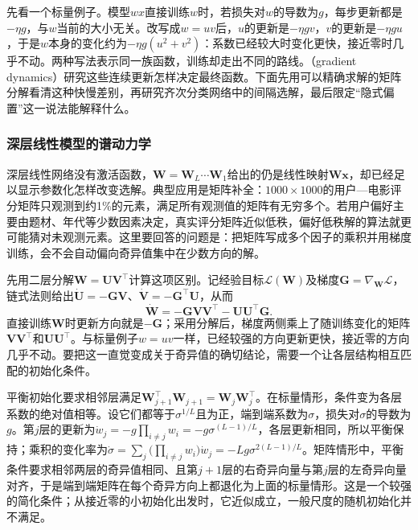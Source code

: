 先看一个标量例子。模型$wx$直接训练$w$时，若损失对$w$的导数为$g$，每步更新都是$-\eta g$，与$w$当前的大小无关。改写成$w=uv$后，$u$的更新是$-\eta gv$，$v$的更新是$-\eta gu$，于是$w$本身的变化约为$-\eta g(u^2+v^2)$：系数已经较大时变化更快，接近零时几乎不动。两种写法表示同一族函数，训练却走出不同的路线。（gradient dynamics）研究这些连续更新怎样决定最终函数。下面先用可以精确求解的矩阵分解看清这种快慢差别，再研究齐次分类网络中的间隔选解，最后限定“隐式偏置”这一说法能解释什么。

\subsubsection{深层线性模型的谱动力学}

深层线性网络没有激活函数，$\bm W=\bm W_L\cdots\bm W_1$给出的仍是线性映射$\bm W\bm x$，却已经足以显示参数化怎样改变选解。典型应用是矩阵补全：$1000\times1000$的用户—电影评分矩阵只观测到约1\%的元素，满足所有观测值的矩阵有无穷多个。若用户偏好主要由题材、年代等少数因素决定，真实评分矩阵近似低秩，偏好低秩解的算法就更可能猜对未观测元素。这里要回答的问题是：把矩阵写成多个因子的乘积并用梯度训练，会不会自动偏向奇异值集中在少数方向的解。

先用二层分解$\bm W=\bm U\bm V^\top$计算这项区别。记经验目标$\mathcal L(\bm W)$及梯度$\bm G=\nabla_{\bm W}\mathcal L$，链式法则给出$\dot{\bm U}=-\bm G\bm V$、$\dot{\bm V}=-\bm G^\top\bm U$，从而
\begin{equation}
 \dot{\bm W}=-\bm G\bm V\bm V^\top-\bm U\bm U^\top\bm G.
 \label{eq:factorized-gradient-flow}
\end{equation}
直接训练$\bm W$时更新方向就是$-\bm G$；采用分解后，梯度两侧乘上了随训练变化的矩阵$\bm V\bm V^\top$和$\bm U\bm U^\top$。与标量例子$w=uv$一样，已经较强的方向更新更快，接近零的方向几乎不动。要把这一直觉变成关于奇异值的确切结论，需要一个让各层结构相互匹配的初始化条件。

平衡初始化要求相邻层满足$\bm W_{j+1}^\top\bm W_{j+1}=\bm W_j\bm W_j^\top$。在标量情形，条件变为各层系数的绝对值相等。设它们都等于$\sigma^{1/L}$且为正，端到端系数为$\sigma$，损失对$\sigma$的导数为$g$。第$j$层的更新为$\dot w_j=-g\prod_{i\neq j}w_i=-g\sigma^{(L-1)/L}$，各层更新相同，所以平衡保持；乘积的变化率为$\dot\sigma=\sum_j\bigl(\prod_{i\neq j}w_i\bigr)\dot w_j=-Lg\sigma^{2(L-1)/L}$。矩阵情形中，平衡条件要求相邻两层的奇异值相同、且第$j+1$层的右奇异向量与第$j$层的左奇异向量对齐，于是端到端矩阵在每个奇异方向上都退化为上面的标量情形。这是一个较强的简化条件；从接近零的小初始化出发时，它近似成立，一般尺度的随机初始化并不满足。

